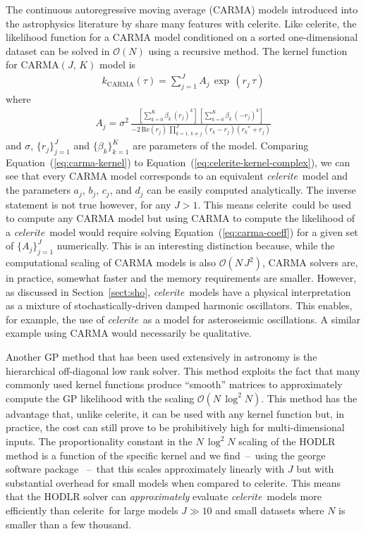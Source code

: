 \documentclass[manuscript, letterpaper]{aastex6}
\newcommand{\project}[1]{\textsf{#1}}
\newcommand{\celerite}{\project{celerite}}
\newcommand{\celeriteterm}{\emph{celerite}}
\renewcommand{\eqref}[1]{\ref{eq:#1}}
\newcommand{\Eq}[1]{Equation~(\eqref{#1})}
\newcommand{\eq}[1]{\Eq{#1}}
\newcommand{\eqlabel}[1]{\label{eq:#1}}
\newcommand{\sectionname}{Section}
\newcommand{\sectref}[1]{\ref{sect:#1}}
\newcommand{\Sect}[1]{\sectionname~\sectref{#1}}
\newcommand{\sect}[1]{\Sect{#1}}
\begin{document}
The continuous autoregressive moving average (CARMA) models introduced into
the astrophysics literature by \citet{Kelly:2014} share many features with
\celerite.
Like \celerite, the likelihood function for a CARMA model conditioned on a
sorted one-dimensional dataset can be solved in $\mathcal{O}(N)$ using a
recursive method.
The kernel function for CARMA$(J,\,K)$ model is \citep{Kelly:2014}
\begin{eqnarray}\eqlabel{carma-kernel}
k_\mathrm{CARMA}(\tau) = \sum_{j=1}^J A_j\,\exp\,(r_j\,\tau)
\end{eqnarray}
where
\begin{eqnarray}\eqlabel{carma-coeff}
A_j = \sigma^2 \,\frac{\left[\sum_{k=0}^K\beta_k\,{(r_j)}^k\right]\,
    \left[\sum_{k=0}^K\beta_k\,{(-r_j)}^k\right]}
    {-2\,\mathrm{Re}(r_j)\,\prod_{k=1,\,k \ne j}^{J}(r_k-r_j)({r_k}^*+r_j)}
\end{eqnarray}
and $\sigma$, $\{r_j\}_{j=1}^J$ and $\{\beta_k\}_{k=1}^K$ are parameters of
the model.
Comparing \eq{carma-kernel} to \eq{celerite-kernel-complex}, we can see that
every CARMA model corresponds to an equivalent \celeriteterm\ model and the
parameters $a_j$, $b_j$, $c_j$, and $d_j$ can be easily computed analytically.
The inverse statement is not true however, for any $J > 1$.
This means \celerite\ could be used to compute any CARMA model but using
CARMA to compute the likelihood of a \celeriteterm\ model would require solving
\eq{carma-coeff} for a given set of $\{A_j\}_{j=1}^J$ numerically.
This is an interesting distinction because, while the computational scaling of
CARMA models is also $\mathcal{O}(N\,J^2)$, CARMA solvers are, in practice,
somewhat faster and the memory requirements are smaller.
However, as discussed in \sect{sho}, \celeriteterm\ models have a physical
interpretation as a mixture of stochastically-driven damped harmonic
oscillators.
This enables, for example, the use of \celeriteterm\ as a model for asteroseismic
oscillations.
A similar example using CARMA would necessarily be qualitative.

Another GP method that has been used extensively in astronomy is the
hierarchical off-diagonal low rank \citep[HODLR,][]{Ambikasaran:2016} solver.
This method exploits the fact that many commonly used kernel functions produce
``smooth'' matrices to approximately compute the GP likelihood with the
scaling $\mathcal{O}(N\,\log^2 N)$.
This method has the advantage that, unlike \celerite, it can be used with any
kernel function but, in practice, the cost can still prove to be prohibitively
high for multi-dimensional inputs.
The proportionality constant in the $N\,\log^2N$ scaling of the HODLR method
is a function of the specific kernel and we find~--~using the \project{george}
software package \citep{Foreman-Mackey:2014, Ambikasaran:2016}~--~that this
scales approximately linearly with $J$ but with substantial overhead for small
models when compared to \celerite.
This means that the HODLR solver can \emph{approximately} evaluate
\celeriteterm\
models more efficiently than \celerite\ for large models $J \gg 10$ and
small datasets where $N$ is smaller than a few thousand.
\end{document}
